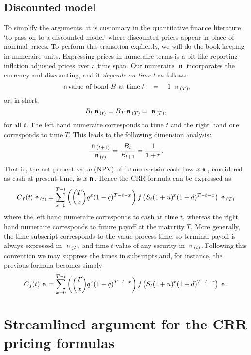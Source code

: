 \documentclass{amsart}
\theoremstyle{definition}
\theoremstyle{remark}
\newcommand{\n}{\!\!\ \nn \!\!\ }
\def\nn{\mathrel{%
    \mathchoice{\n}{\n}{\scriptsize\n}{\tiny\n}%
}}
\def\n {{%
    \setbox0\hbox{ \textsf{n}\!\  }%
    \rlap{\hbox to \wd0{\hss \!\ --\hss}}\box0
}}
\numberwithin{equation}{section}
\newcommand{\1}{\boldsymbol{1}}
\begin{document}
\subsection{Discounted model}
To simplify the arguments, it is customary in the quantitative finance literature `to pass on to a discounted model' where discounted prices appear in place of nominal prices. To perform this transition explicitly, we will do the book keeping in numeraire units. Expressing prices in numeraire terms is a bit like reporting inflation adjusted prices over a time span.
Our numeraire $\n$ incorporates the currency and discounting, and it \emph{depends on time} $t$ as follows:
\[\n \text{value\ of\ bond\ } B\ \text{at time}\ t \quad =\quad 1\ \n_{(T)},\]
or, in short,
\[B_t  \n_{(t)} =B_T \n_{(T)} =\n_{(T)},\]
for all $t$. The left hand numeraire corresponds to time $t$ and the right hand one corresponds to time $T$.
This leads to the following dimension analysis:
\[\frac{\n_{(t+1)}}{\n_{(t)}}=\frac{B_{t}}{B_{t+1} }=\frac{1}{1+r} .\]
That is, the net present value (NPV) of future certain cash flow $x \n$, considered as cash at present time, is 
$x  \n$. Hence the CRR formula can be expressed as
\begin{equation}
\label{eq:CRR1}
C_f(t) \n_{(t)} = \sum_{x=0}^{T-t}\left(\binom{T}{x}q^x(1-q)^{T-t-x}\right)  f\left(S_t (1+u)^x (1+d)^{T-t-x}\right) \n_{(T)} 
\end{equation}
where the left hand numeraire corresponds to cash at time $t$, whereas the right hand numeraire corresponds 
to future payoff at the maturity $T$. More generally, the time subscript corresponds to the value process time, 
so terminal payoff is always expressed in $\n_{(T)}$ and time $t$ value of any security in $\n_{(t)}$.
Following this convention we may suppress the times in subscripts and, for instance, the previous formula becomes simply
\[C_f(t) \n = \sum_{x=0}^{T-t}\left(\binom{T}{x}q^x(1-q)^{T-t-x}\right)  f\left(S_t (1+u)^x (1+d)^{T-t-x}\right) \n.\] 



\section{Streamlined argument for the CRR pricing formulas}\label{Section2}
\end{document}
